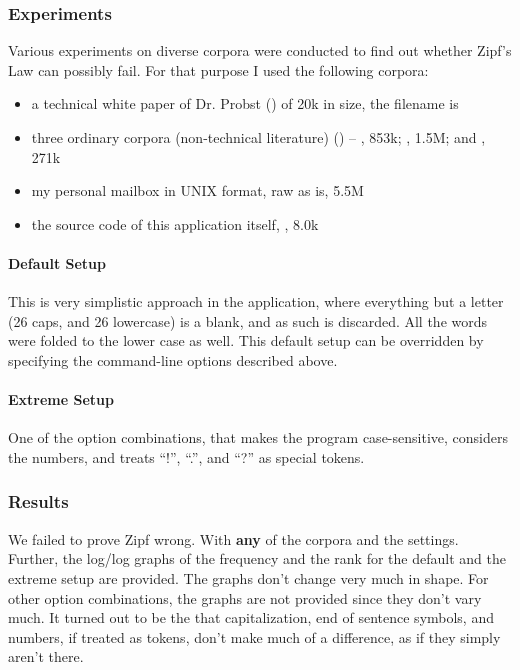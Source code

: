 \subsubsection{Experiments}

Various experiments on diverse corpora were conducted to find
out whether Zipf's Law can possibly fail. For that purpose
I used the following corpora:

\begin{itemize}
\item a technical white paper of Dr. Probst (\cite{probst95}) of 20k in size, the filename is 
\item three ordinary corpora (non-technical literature)
	(\cite{greif, ulysses, speak}) -- , 853k;
	, 1.5M; and , 271k
\item my personal mailbox in UNIX format, raw as is, 5.5M
\item the source code of this application itself, , 8.0k
\end{itemize}


\paragraph{Default Setup}

This is very simplistic approach in the application, where
everything but a letter (26 caps, and 26 lowercase) is a
blank, and as such is discarded. All the words were folded to the
lower case as well. This default setup can be overridden by
specifying the command-line options described above.

\paragraph{Extreme Setup}

One of the option combinations, that makes the program
case-sensitive, considers the numbers, and treats ``!'',
``.'', and ``?'' as special tokens.

\subsubsection{Results}

We failed to prove Zipf wrong. With {\bf any} of the corpora and the settings.
Further, the log/log graphs of the frequency and the rank
for the default and the extreme setup are provided. The graphs don't change very much
in shape. For other option combinations, the graphs are not provided
since they don't vary much.
It turned out to be the that capitalization, end of sentence symbols,
and numbers, if treated as tokens, don't make much of a difference,
as if they simply aren't there.

